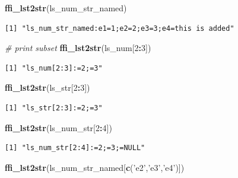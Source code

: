 \documentclass[
]{book}
\newenvironment{Shaded}{\begin{snugshade}}{\end{snugshade}}
\newcommand{\CommentTok}[1]{\textcolor[rgb]{0.56,0.35,0.01}{\textit{#1}}}
\newcommand{\DecValTok}[1]{\textcolor[rgb]{0.00,0.00,0.81}{#1}}
\newcommand{\KeywordTok}[1]{\textcolor[rgb]{0.13,0.29,0.53}{\textbf{#1}}}
\newcommand{\NormalTok}[1]{#1}
\newcommand{\OperatorTok}[1]{\textcolor[rgb]{0.81,0.36,0.00}{\textbf{#1}}}
\newcommand{\StringTok}[1]{\textcolor[rgb]{0.31,0.60,0.02}{#1}}
\begin{document}
\begin{Shaded}
\begin{Highlighting}[]
\KeywordTok{ffi_lst2str}\NormalTok{(ls_num_str_named)}
\end{Highlighting}
\end{Shaded}

\begin{verbatim}
[1] "ls_num_str_named:e1=1;e2=2;e3=3;e4=this is added"
\end{verbatim}

\begin{Shaded}
\begin{Highlighting}[]
\CommentTok{# print subset}
\KeywordTok{ffi_lst2str}\NormalTok{(ls_num[}\DecValTok{2}\OperatorTok{:}\DecValTok{3}\NormalTok{])}
\end{Highlighting}
\end{Shaded}

\begin{verbatim}
[1] "ls_num[2:3]:=2;=3"
\end{verbatim}

\begin{Shaded}
\begin{Highlighting}[]
\KeywordTok{ffi_lst2str}\NormalTok{(ls_str[}\DecValTok{2}\OperatorTok{:}\DecValTok{3}\NormalTok{])}
\end{Highlighting}
\end{Shaded}

\begin{verbatim}
[1] "ls_str[2:3]:=2;=3"
\end{verbatim}

\begin{Shaded}
\begin{Highlighting}[]
\KeywordTok{ffi_lst2str}\NormalTok{(ls_num_str[}\DecValTok{2}\OperatorTok{:}\DecValTok{4}\NormalTok{])}
\end{Highlighting}
\end{Shaded}

\begin{verbatim}
[1] "ls_num_str[2:4]:=2;=3;=NULL"
\end{verbatim}

\begin{Shaded}
\begin{Highlighting}[]
\KeywordTok{ffi_lst2str}\NormalTok{(ls_num_str_named[}\KeywordTok{c}\NormalTok{(}\StringTok{'e2'}\NormalTok{,}\StringTok{'e3'}\NormalTok{,}\StringTok{'e4'}\NormalTok{)])}
\end{Highlighting}
\end{Shaded}
\end{document}
